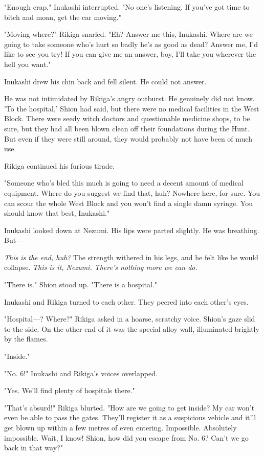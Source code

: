 "Enough crap," Inukashi interrupted. "No one's listening. If you've got
time to bitch and moan, get the car moving."

"Moving where?" Rikiga snarled. "Eh? Answer me this, Inukashi. Where are
we going to take someone who's hurt so badly he's as good as dead?
Answer me, I'd like to see you try! If you can give me an answer, boy,
I'll take you wherever the hell you want."

Inukashi drew his chin back and fell silent. He could not answer.

He was not intimidated by Rikiga's angry outburst. He genuinely did not
know. 'To the hospital,' Shion had said, but there were no medical
facilities in the West Block. There were seedy witch doctors and
questionable medicine shops, to be sure, but they had all been blown
clean off their foundations during the Hunt. But even if they were still
around, they would probably not have been of much use.

Rikiga continued his furious tirade.

"Someone who's bled this much is going to need a decent amount of
medical equipment. Where do you suggest we find that, huh? Nowhere here,
for sure. You can scour the whole West Block and you won't find a single
damn syringe. You should know that best, Inukashi."

Inukashi looked down at Nezumi. His lips were parted slightly. He was
breathing. But---

\emph{This is the end, huh?} The strength withered in his legs, and he felt
like he would collapse. \emph{This is it, Nezumi. There's nothing more we can
do.}

\mybreak

"There is." Shion stood up. "There is a hospital."

Inukashi and Rikiga turned to each other. They peered into each other's
eyes.

"Hospital---? Where?" Rikiga asked in a hoarse, scratchy voice. Shion's
gaze slid to the side. On the other end of it was the special alloy
wall, illuminated brightly by the flames.

"Inside."

"No. 6!" Inukashi and Rikiga's voices overlapped.

"Yes. We'll find plenty of hospitals there."

"That's absurd!" Rikiga blurted. "How are we going to get inside? My car
won't even be able to pass the gates. They'll register it as a
suspicious vehicle and it'll get blown up within a few metres of even
entering. Impossible. Absolutely impossible. Wait, I know! Shion, how
did you escape from No. 6? Can't we go back in that way?"

